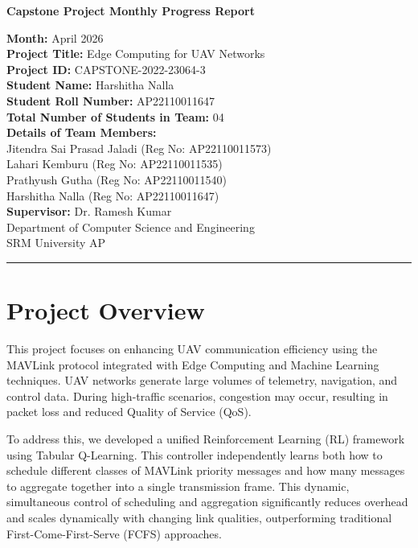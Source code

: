 \documentclass[12pt,a4paper]{article}
\begin{document}
\begin{center}
    \Large \textbf{Capstone Project Monthly Progress Report}\\[0.5cm]
    \normalsize
    
    \textbf{Month:} April 2026 \\[0.5cm]
    \textbf{Project Title:} Edge Computing for UAV Networks \\[0.5cm]
    \textbf{Project ID:} CAPSTONE-2022-23064-3 \\[0.5cm]
    \textbf{Student Name:} Harshitha Nalla \\
    \textbf{Student Roll Number:} AP22110011647\\[0.3cm]

    \textbf{Total Number of Students in Team:} 04 \\
    \textbf{Details of Team Members:}\\
    Jitendra Sai Prasad Jaladi (Reg No: AP22110011573)\\
    Lahari Kemburu (Reg No: AP22110011535)\\
    Prathyush Gutha (Reg No: AP22110011540)\\
    Harshitha Nalla (Reg No: AP22110011647)\\[0.5cm]
    
    \textbf{Supervisor:} Dr. Ramesh Kumar\\[0.5cm]
    Department of Computer Science and Engineering\\
    SRM University AP
\end{center}

\hrule
\vspace{1cm}

\section{Project Overview}
This project focuses on enhancing UAV communication efficiency using the MAVLink protocol integrated with Edge Computing and Machine Learning techniques. UAV networks generate large volumes of telemetry, navigation, and control data. During high-traffic scenarios, congestion may occur, resulting in packet loss and reduced Quality of Service (QoS). 

To address this, we developed a unified Reinforcement Learning (RL) framework using Tabular Q-Learning. This controller independently learns both how to schedule different classes of MAVLink priority messages and how many messages to aggregate together into a single transmission frame. This dynamic, simultaneous control of scheduling and aggregation significantly reduces overhead and scales dynamically with changing link qualities, outperforming traditional First-Come-First-Serve (FCFS) approaches.
\end{document}
